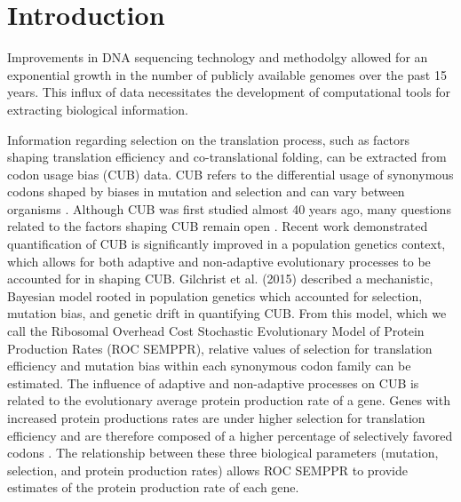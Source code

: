 \documentclass{bioinfo}
\begin{document}
\section*{Introduction}
Improvements in DNA sequencing technology and methodolgy allowed for an exponential growth in the number of publicly available genomes over the past 15 years.
This influx of data necessitates the development of computational tools for extracting biological information.

Information regarding selection on the translation process, such as factors shaping translation efficiency and co-translational folding, can be extracted from codon usage bias (CUB) data.
CUB refers to the differential usage of synonymous codons shaped by biases in mutation and selection and can vary between organisms \citep{bulmer1991, sharp1993}.
Although CUB was first studied almost 40 years ago, many questions related to the factors shaping CUB remain open \citep{shah2011, wallace2013, gilchrist2015}.
Recent work demonstrated quantification of CUB is significantly improved in a population genetics context, which allows for both adaptive and non-adaptive evolutionary processes to be accounted for in shaping CUB.
Gilchrist et al. (2015) described a mechanistic, Bayesian model rooted in population genetics which accounted for selection, mutation bias, and genetic drift in quantifying CUB. 
From this model, which we call the Ribosomal Overhead Cost Stochastic Evolutionary Model of Protein Production Rates (ROC SEMPPR), relative values of selection for translation efficiency and mutation bias within each synonymous codon family can be estimated. 
The influence of adaptive and non-adaptive processes on CUB is related to the evolutionary average protein production rate of a gene. Genes with increased protein productions rates are under higher selection for translation efficiency and are therefore composed of a higher percentage of selectively favored codons \citep{shah2011, wallace2013, gilchrist2015}. The relationship between these three biological parameters (mutation, selection, and protein production rates) allows ROC SEMPPR to provide estimates of the protein production rate of each gene.
\end{document}
